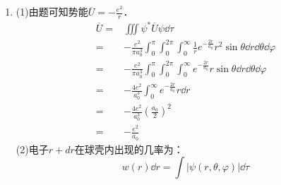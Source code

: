 
\begin{issues}
\issueDraft
\end{issues}


\subsection{ }
\begin{enumerate}
\item 
(1)由题可知势能$\overline{U}=-\frac{e^2}{r}$．
\begin{equation}
\begin{aligned}
\overline{U}=&\iiint \psi^{*} \overline{U} \psi \dd{\tau}\\
=&-\frac{e^2}{\pi a^{3}_{0}}\int^{\pi}_{0}\int^{2\pi}_{0}\int^{\infty}_{0} \frac{1}{r}e^{-\frac{2r}{a_0}}r^{2}\sin{\theta} \dd{r}\dd{\theta}\dd{\varphi}\\
=&-\frac{e^{2}}{\pi a^{3}_{0}}\int^{\pi}_{0}\int^{2\pi}_{0}\int^{\infty}_{0} e^{-\frac{2r}{a_0}}r\sin{\theta} \dd{r}\dd{\theta}\dd{\varphi}\\
=&-\frac{4 e^2}{a^{3}_{0}}\int^{\infty}_{0}e^{-\frac{2r}{a_0}}r\dd{r}\\
=&-\frac{4e^{2}}{a^{3}_{0}}(\frac{a_{0}}{2})^2\\
=&-\frac{e^{2}}{a_{0}}
\end{aligned}
\end{equation}
(2)电子$r+dr$在球壳内出现的几率为：\\
\begin{equation}
w(r)\dd{r}=\int \lvert \psi(r,\theta,\varphi) \rvert \dd{\tau}
\end{equation}

\end{enumerate}